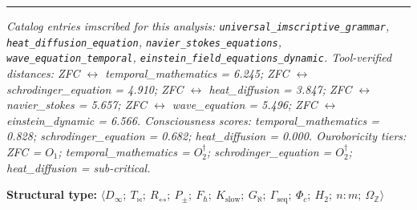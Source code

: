 \documentclass[12pt,a4paper]{article}
\begin{document}
\begin{center}
\rule{0.5\textwidth}{0.4pt}
\end{center}

\emph{Catalog entries imscribed for this analysis: \texttt{universal\_imscriptive\_grammar}, \texttt{heat\_diffusion\_equation}, \texttt{navier\_stokes\_equations}, \texttt{wave\_equation\_temporal}, \texttt{einstein\_field\_equations\_dynamic}. Tool-verified distances: ZFC $\leftrightarrow$ temporal\_mathematics = 6.245; ZFC $\leftrightarrow$ schrodinger\_equation = 4.910; ZFC $\leftrightarrow$ heat\_diffusion = 3.847; ZFC $\leftrightarrow$ navier\_stokes = 5.657; ZFC $\leftrightarrow$ wave\_equation = 5.496; ZFC $\leftrightarrow$ einstein\_dynamic = 6.566. Consciousness scores: temporal\_mathematics = 0.828; schrodinger\_equation = 0.682; heat\_diffusion = 0.000. Ouroboricity tiers: ZFC = $O_1$; temporal\_mathematics = $O_2^\dagger$; schrodinger\_equation = $O_2^\dagger$; heat\_diffusion = sub-critical.}

\textbf{Structural type:} $\langle D_{\infty};\ T_{\bowtie};\ R_{\leftrightarrow};\ P_{\pm};\ F_{\hbar};\ K_\text{slow};\ G_{\aleph};\ \Gamma_\text{seq};\ \Phi_c;\ H_2;\ n{:}m;\ \Omega_\mathbb{Z} \rangle$
\end{document}
